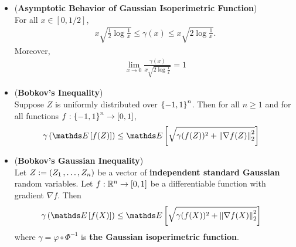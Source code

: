 \documentclass[11pt]{article}
\begin{document}
\begin{itemize}
\item \begin{lemma} (\textbf{Asymptotic Behavior of Gaussian Isoperimetric Function}) \citep{boucheron2013concentration}\\
For all $x \in [0, 1/2]$, 
\begin{align*}
x\sqrt{\frac{1}{2} \log\frac{1}{x}} \le \gamma(x) \le x\sqrt{2 \log \frac{1}{x}}.
\end{align*} Moreover, 
\begin{align*}
\lim\limits_{x \to 0}\frac{\gamma(x)}{x\sqrt{2\log \frac{1}{x}}} = 1
\end{align*}
\end{lemma}

\item \begin{proposition} (\textbf{Bobkov's Inequality}) \citep{boucheron2013concentration}\\
Suppose $Z$ is uniformly distributed over $\left\{-1,1\right\}^n$. Then for all $n \ge 1$ and for all functions $f: \left\{-1, 1\right\}^n \to [0,1]$,
\begin{align}
\gamma\paren{\E{}{f(Z)}} &\le \E{}{\sqrt{\gamma(f(Z))^2 + \norm{\nabla f(Z)}{2}^2 }} \label{ineqn: bobkov_inequality}
\end{align}
\end{proposition}

\item \begin{proposition} (\textbf{Bobkov's Gaussian Inequality}) \citep{boucheron2013concentration}\\
Let $Z := (Z_1 \,{,}\ldots{,}\, Z_n)$ be a vector of \textbf{independent standard Gaussian} random variables. Let $f: {\mathbb R}^n \to [0, 1]$ be a differentiable function with gradient $\nabla f$. Then
\begin{align}
\gamma\paren{\E{}{f(X)}} &\le \E{}{\sqrt{\gamma(f(X))^2 + \norm{\nabla f(X)}{2}^2 }} \label{ineqn: bobkov_gaussian_inequality}
\end{align} where $\gamma = \varphi \circ \Phi^{-1}$ is \textbf{the Gaussian isoperimetric function}.
\end{proposition}




\end{itemize}
\end{document}
